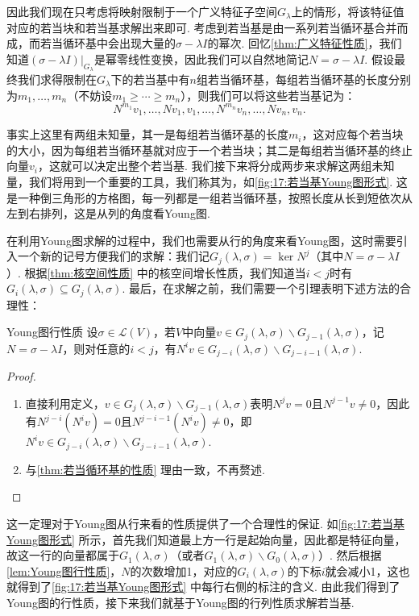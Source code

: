 因此我们现在只考虑将映射限制于一个广义特征子空间$G_\lambda$上的情形，将该特征值对应的若当块和若当基求解出来即可. 考虑到若当基是由一系列若当循环基合并而成，而若当循环基中会出现大量的$\sigma-\lambda I$的幂次. 回忆\autoref{thm:广义特征性质}，我们知道$(\sigma-\lambda I)\vert_{G_\lambda}$是幂零线性变换，因此我们可以自然地简记$N=\sigma-\lambda I$. 假设最终我们求得限制在$G_\lambda$下的若当基中有$n$组若当循环基，每组若当循环基的长度分别为$m_1,\ldots,m_n$（不妨设$m_1\geqslant\cdots\geqslant m_n$），则我们可以将这些若当基记为：
\[N^{m_1}v_1,\ldots,Nv_1,v_1,\ldots,N^{m_n}v_n,\ldots,Nv_n,v_n.\]

事实上这里有两组未知量，其一是每组若当循环基的长度$m_i$，这对应每个若当块的大小，因为每组若当循环基就对应于一个若当块；其二是每组若当循环基的终止向量$v_i$，这就可以决定出整个若当基. 我们接下来将分成两步来求解这两组未知量，我们将用到一个重要的工具，我们称其为，如\autoref{fig:17:若当基Young图形式}. 这是一种倒三角形的方格图，每一列都是一组若当循环基，按照长度从长到短依次从左到右排列，这是从列的角度看Young图.

在利用Young图求解的过程中，我们也需要从行的角度来看Young图，这时需要引入一个新的记号方便我们的求解：我们记$G_j(\lambda,\sigma)=\ker N^j$（其中$N=\sigma-\lambda I$）. 根据\autoref{thm:核空间性质} 中的核空间增长性质，我们知道当$i<j$时有$G_i(\lambda,\sigma)\subseteq G_j(\lambda,\sigma)$. 最后，在求解之前，我们需要一个引理表明下述方法的合理性：
\begin{lemma}{}{Young图行性质}
    设$\sigma\in \mathcal{L}(V)$，若$V$中向量$v\in G_j(\lambda,\sigma)\backslash G_{j-1}(\lambda,\sigma)$，记$N=\sigma-\lambda I$，则对任意的$i<j$，有$N^iv\in G_{j-i}(\lambda,\sigma)\backslash G_{j-i-1}(\lambda,\sigma)$.
\end{lemma}

\begin{proof}
    \begin{enumerate}
        \item 直接利用定义，$v\in G_j(\lambda,\sigma)\backslash G_{j-1}(\lambda,\sigma)$表明$N^jv=0$且$N^{j-1}v\neq 0$，因此有$N^{j-i}(N^iv)=0$且$N^{j-i-1}(N^iv)\neq 0$，即$N^iv\in G_{j-i}(\lambda,\sigma)\backslash G_{j-i-1}(\lambda,\sigma)$.

        \item 与\autoref{thm:若当循环基的性质} 理由一致，不再赘述.
    \end{enumerate}
\end{proof}

这一定理对于Young图从行来看的性质提供了一个合理性的保证. 如\autoref{fig:17:若当基Young图形式} 所示，首先我们知道最上方一行是起始向量，因此都是特征向量，故这一行的向量都属于$G_1(\lambda,\sigma)$（或者$G_1(\lambda,\sigma)\backslash G_0(\lambda,\sigma)$）. 然后根据\autoref{lem:Young图行性质}，$N$的次数增加1，对应的$G_i(\lambda,\sigma)$的下标$i$就会减小1，这也就得到了\autoref{fig:17:若当基Young图形式} 中每行右侧的标注的含义. 由此我们得到了Young图的行性质，接下来我们就基于Young图的行列性质求解若当基.

